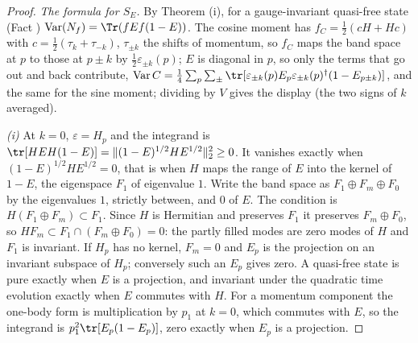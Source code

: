 \begin{proof}
\emph{The formula for $S_{E}$.} By Theorem (i), for a gauge-invariant quasi-free state (Fact ) $\mathrm{Var}(N_{f}) = \Tr(fEf(1 - E))$. The cosine moment has $f_{C} = \tfrac12(cH + Hc)$ with $c = \tfrac12(\tau_{k} + \tau_{-k})$, $\tau_{\pm k}$ the shifts of momentum, so $f_{C}$ maps the band space at $p$ to those at $p \pm k$ by $\tfrac12\varepsilon_{\pm k}(p)$; $E$ is diagonal in $p$, so only the terms that go out and back contribute, $\mathrm{Var}\,C = \tfrac14\sum_{p}\sum_{\pm}\tr[\varepsilon_{\pm k}(p)E_{p}\varepsilon_{\pm k}(p)^{\dagger}(1 - E_{p \pm k})]$, and the same for the sine moment; dividing by $V$ gives the display (the two signs of $k$ averaged).

\emph{(i)} At $k = 0$, $\varepsilon = H_{p}$ and the integrand is $\tr[HEH(1 - E)] = \|(1 - E)^{1/2}HE^{1/2}\|_{2}^{2} \ge 0$. It vanishes exactly when $(1 - E)^{1/2}HE^{1/2} = 0$, that is when $H$ maps the range of $E$ into the kernel of $1 - E$, the eigenspace $F_{1}$ of eigenvalue $1$. Write the band space as $F_{1} \oplus F_{m} \oplus F_{0}$ by the eigenvalues $1$, strictly between, and $0$ of $E$. The condition is $H(F_{1} \oplus F_{m}) \subset F_{1}$. Since $H$ is Hermitian and preserves $F_{1}$ it preserves $F_{m} \oplus F_{0}$, so $HF_{m} \subset F_{1} \cap (F_{m} \oplus F_{0}) = 0$: the partly filled modes are zero modes of $H$ and $F_{1}$ is invariant. If $H_{p}$ has no kernel, $F_{m} = 0$ and $E_{p}$ is the projection on an invariant subspace of $H_{p}$; conversely such an $E_{p}$ gives zero. A quasi-free state is pure exactly when $E$ is a projection, and invariant under the quadratic time evolution exactly when $E$ commutes with $H$. For a momentum component the one-body form is multiplication by $p_{1}$ at $k = 0$, which commutes with $E$, so the integrand is $p_{1}^{2}\tr[E_{p}(1 - E_{p})]$, zero exactly when $E_{p}$ is a projection.


\end{proof}
